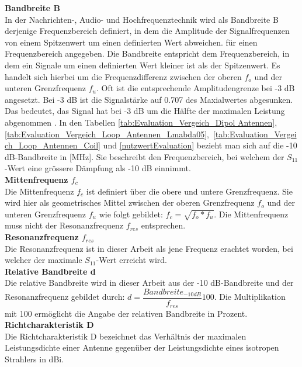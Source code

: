 \textbf{Bandbreite B}\\
In der Nachrichten-, Audio- und Hochfrequenztechnik wird  als Bandbreite B derjenige Frequenzbereich definiert, in dem die Amplitude der Signalfrequenzen von einem Spitzenwert um einen definierten Wert abweichen. für einen Frequenzbereich angegeben. Die Bandbreite entspricht dem Frequenzbereich, in dem ein Signale um einen definierten Wert kleiner ist als der Spitzenwert. Es handelt sich hierbei um die Frequenzdifferenz zwischen der oberen $f_o$ und der unteren Grenzfrequenz $f_u$. Oft ist die entsprechende Amplitudengrenze bei -3 dB angesetzt. Bei -3 dB ist die Signalstärke auf 0.707 des Maxialwertes abgesunken. Das bedeutet, das Signal hat bei -3 dB um die Hälfte der maximalen Leistung abgenommen \cite{Bandbreite_B}.
In den Tabellen \ref{tab:Evaluation_Vergeich_Dipol Antennen}, \ref{tab:Evaluation_Vergeich_Loop_Antennen_Lmabda05},\  \ref{tab:Evaluation_Vergeich_Loop_Antennen_Coil} und \ref{nutzwertEvaluation} bezieht man sich auf die -10 dB-Bandbreite in [MHz]. Sie beschreibt den Frequenzbereich, bei welchem der $S_{11}$-Wert eine grössere Dämpfung als -10 dB einnimmt.\\

\textbf{Mittenfrequenz $f_{c}$}\\
Die Mittenfrequenz $f_c$ ist definiert über die obere und untere Grenzfrequenz. Sie wird hier als geometrisches Mittel zwischen der oberen Grenzfrequenz $f_o$ und der unteren Grenzfrequenz $f_u$ wie folgt gebildet: $f_c=\sqrt{f_o*f_u}$. Die Mittenfrequenz muss nicht der Resonanzfrequenz $f_{res}$ entsprechen.\\

\textbf{Resonanzfrequenz $f_{res}$}\\
Die Resonanzfrequenz ist in dieser Arbeit als jene Frequenz erachtet worden, bei welcher der maximale $S_{11}$-Wert erreicht wird.\\

\textbf{Relative Bandbreite d}\\
Die relative Bandbreite wird in dieser Arbeit aus der -10 dB-Bandbreite und der  
Resonanzfrequenz gebildet durch: $d=\dfrac{Bandbreite_{-10dB}}{f_{res}}100$. Die Multiplikation mit 100 ermöglicht die Angabe der relativen Bandbreite in Prozent. \\

\textbf{Richtcharakteristik D}\\
Die Richtcharakteristik D bezeichnet das Verhältnis der maximalen Leistungsdichte einer Antenne gegenüber der Leistungsdichte eines isotropen Strahlers in dBi.\\

